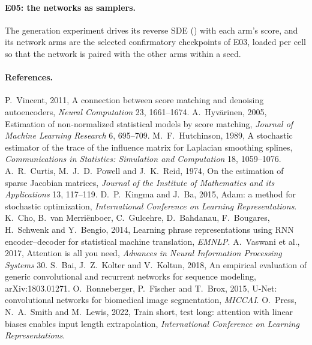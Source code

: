 \paragraph{E05: the networks as samplers.}
The generation experiment drives its reverse SDE () with
each arm's score, and its network arms are the selected confirmatory checkpoints of E03,
loaded per cell so that the network is paired with the other arms within a seed.


\paragraph{References.}
\begingroup\sloppy
P.~Vincent, 2011, A connection between score matching and denoising autoencoders, \emph{Neural Computation} 23, 1661--1674.
A.~Hyv\"arinen, 2005, Estimation of non-normalized statistical models by score matching, \emph{Journal of Machine Learning Research} 6, 695--709.
M.~F.~Hutchinson, 1989, A stochastic estimator of the trace of the influence matrix for Laplacian smoothing splines, \emph{Communications in Statistics: Simulation and Computation} 18, 1059--1076.
A.~R.~Curtis, M.~J.~D.~Powell and J.~K.~Reid, 1974, On the estimation of sparse Jacobian matrices, \emph{Journal of the Institute of Mathematics and its Applications} 13, 117--119.
D.~P.~Kingma and J.~Ba, 2015, Adam: a method for stochastic optimization, \emph{International Conference on Learning Representations}.
K.~Cho, B.~van Merri\"enboer, C.~Gulcehre, D.~Bahdanau, F.~Bougares, H.~Schwenk and Y.~Bengio, 2014, Learning phrase representations using RNN encoder--decoder for statistical machine translation, \emph{EMNLP}.
A.~Vaswani et al., 2017, Attention is all you need, \emph{Advances in Neural Information Processing Systems} 30.
S.~Bai, J.~Z.~Kolter and V.~Koltun, 2018, An empirical evaluation of generic convolutional and recurrent networks for sequence modeling, arXiv:1803.01271.
O.~Ronneberger, P.~Fischer and T.~Brox, 2015, U-Net: convolutional networks for biomedical image segmentation, \emph{MICCAI}.
O.~Press, N.~A.~Smith and M.~Lewis, 2022, Train short, test long: attention with linear biases enables input length extrapolation, \emph{International Conference on Learning Representations}.\par\endgroup
